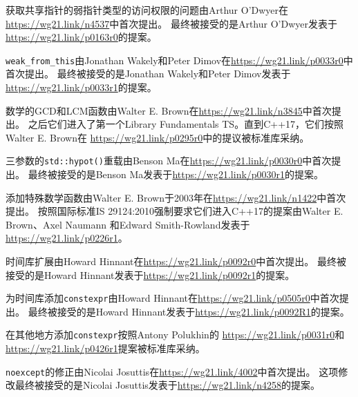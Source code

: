 获取共享指针的弱指针类型的访问权限的问题由Arthur O’Dwyer在\url{https://wg21.link/n4537}中首次提出。
最终被接受的是Arthur O’Dwyer发表于\url{https://wg21.link/p0163r0}的提案。

\texttt{weak\_from\_this}由Jonathan Wakely和Peter Dimov在\url{https://wg21.link/p0033r0}中首次提出。
最终被接受的是Jonathan Wakely和Peter Dimov发表于\url{https://wg21.link/p0033r1}的提案。

数学的GCD和LCM函数由Walter E. Brown在\url{https://wg21.link/n3845}中首次提出。
之后它们进入了第一个Library Fundamentals TS。直到C++17，它们按照Walter E. Brown在
\url{https://wg21.link/p0295r0}中的提议被标准库采纳。

三参数的\texttt{std::hypot()}重载由Benson Ma在\url{https://wg21.link/p0030r0}中首次提出。
最终被接受的是Benson Ma发表于\url{https://wg21.link/p0030r1}的提案。

添加特殊数学函数由Walter E. Brown于2003年在\url{https://wg21.link/n1422}中首次提出。
按照国际标准IS 29124:2010强制要求它们进入C++17的提案由Walter E. Brown、Axel Naumann
和Edward Smith-Rowland发表于\url{https://wg21.link/p0226r1}。

时间库扩展由Howard Hinnant在\url{https://wg21.link/p0092r0}中首次提出。
最终被接受的是Howard Hinnant发表于\url{https://wg21.link/p0092r1}的提案。

为时间库添加\texttt{constexpr}由Howard Hinnant在\url{https://wg21.link/p0505r0}中首次提出。
最终被接受的是Howard Hinnant发表于\url{https://wg21.link/p0092R1}的提案。

在其他地方添加\texttt{constexpr}按照Antony Polukhin的
\url{https://wg21.link/p0031r0}和\url{https://wg21.link/p0426r1}提案被标准库采纳。

\texttt{noexcept}的修正由Nicolai Josuttis在\url{https://wg21.link/4002}中首次提出。
这项修改最终被接受的是Nicolai Josuttis发表于\url{https://wg21.link/n4258}的提案。
